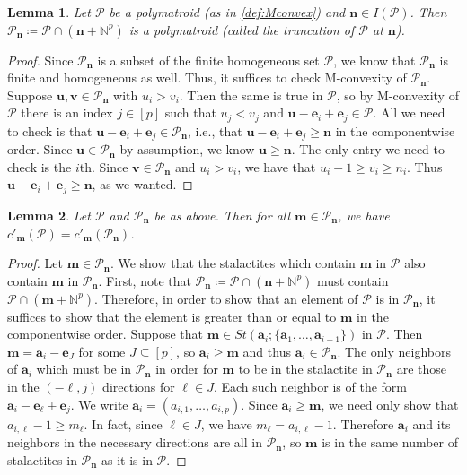 \documentclass[a4paper, 11pt]{amsart}
\newtheorem{lemma}[lemma]{Lemma}
\theoremstyle{definition}
\newcommand{\bfu}{\mathbf{u}}
\newcommand{\bfv}{\mathbf{v}}
\newcommand{\bfm}{\mathbf{m}}
\newcommand{\bfn}{\mathbf{n}}
\newcommand{\bfa}{\mathbf{a}}
\newcommand{\bfe}{\mathbf{e}}
\newcommand{\sP}{\mathscr{P}}
\newcommand{\N}{\mathbb{N}}
\begin{document}
\begin{lemma}\label{lem:lem1}
    Let $\mathscr{P}$ be a polymatroid (as in \autoref{def:Mconvex}) and $\bfn \in I(\mathscr{P})$. Then $\mathscr{P}_{\bfn} \coloneqq \mathscr{P} \cap (\bfn + \N^p)$ is a polymatroid (called the truncation of $\sP$ at $\bfn$).  
\end{lemma} 

\begin{proof}
    Since $\sP_{\bfn}$ is a subset of the finite homogeneous set $\sP$, we know that $\sP_{\bfn}$ is finite and homogeneous as well. Thus, it suffices to check M-convexity of $\sP_{\bfn}$. Suppose $\bfu,\bfv \in \sP_{\bfn}$ with $u_i > v_i$. Then the same is true in $\sP$, so by M-convexity of  $\mathscr{P}$ there is an index $j \in [p]$ such that $u_j<v_j$ and $\bfu-\bfe_i+\bfe_j \in \mathscr{P}$. All we need to check is that $ \bfu-\bfe_i+\bfe_j \in \sP_{\bfn}$, i.e., that $\bfu-\bfe_i+\bfe_j \ge \bfn$ in the componentwise order. Since $\bfu \in \sP_{\bfn}$ by assumption, we know $\bfu \ge \bfn$. The only entry we need to check is the $i$th. Since $\bfv \in \sP_{\bfn}$ and $u_i > v_i$, we have that $u_i-1 \ge v_i \ge n_i$. Thus $\bfu-\bfe_i+\bfe_j \ge \bfn$, as we wanted. 
\end{proof}

\begin{lemma}\label{lem:lem2}
    Let $\mathscr{P}$ and $\sP_{\bfn}$ be as above. Then for all $\bfm \in \sP_{\bfn}$, we have $c'_\bfm(\mathscr{P}) = c'_\bfm(\sP_{\bfn})$. 
\end{lemma} 
\begin{proof}
    Let $\bfm \in \sP_{\bfn}$. We show that the stalactites which contain $\bfm$ in $\sP$ also contain $\bfm$ in $\sP_{\bfn}$. First, note that $\sP_{\bfn} \coloneqq \sP \cap (\bfn + \N^p)$ must contain $ \sP \cap (\bfm + \N^p)$. Therefore, in order to show that an element of $\sP$ is in $\sP_{\bfn}$, it suffices to show that the element is greater than or equal to $\bfm$ in the componentwise order. Suppose that $\bfm \in St(\bfa_i;\{\bfa_1,\ldots,\bfa_{i-1}\})$ in $\mathscr{P}$. Then $\bfm = \bfa_i-\bfe_J$ for some $J \subseteq [p]$, so $\bfa_i \ge \bfm$ and thus $\bfa_i \in \sP_\bfn$. The only neighbors of $\bfa_i$ which must be in $\sP_{\bfn}$ in order for $\bfm$ to be in the stalactite in $\sP_{\bfn}$ are those in the $(-\ell,j)$ directions for $\ell \in J$. Each such neighbor is of the form $\bfa_i - \bfe_\ell+\bfe_j$. We write $\bfa_i = (a_{i,1},\ldots, a_{i, p})$. Since $\bfa_i \ge \bfm$, we need only show that $a_{i,\ell}-1 \ge m_\ell$. In fact, since $\ell \in J$, we have $m_\ell = a_{i,\ell}-1$. Therefore $\bfa_i$ and its neighbors in the necessary directions are all in $\sP_{\bfn}$, so $\bfm$ is in the same number of stalactites in $\sP_{\bfn}$ as it is in $\sP$. 
\end{proof}
\end{document}
